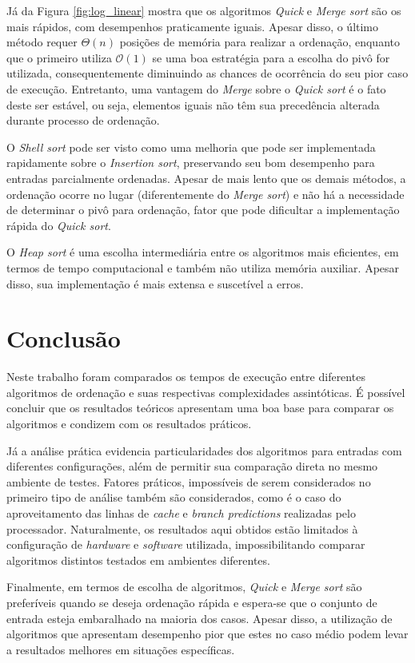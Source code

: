 \documentclass[12pt]{article}
\begin{document}
Já da Figura \ref{fig:log_linear} mostra que os algoritmos \textit{Quick} e \textit{Merge sort} são os mais rápidos, com desempenhos praticamente iguais. Apesar disso, o último método requer $\Theta(n)$ posições de memória para realizar a ordenação, enquanto que o primeiro utiliza $\mathcal{O}(1)$ se uma boa estratégia para a escolha do pivô for utilizada, consequentemente diminuindo as chances de ocorrência do seu pior caso de execução. Entretanto, uma vantagem do \textit{Merge} sobre o \textit{Quick sort} é o fato deste ser estável, ou seja, elementos iguais não têm sua precedência alterada durante processo de ordenação.

O \textit{Shell sort} pode ser visto como uma melhoria que pode ser implementada rapidamente sobre o \textit{Insertion sort}, preservando seu bom desempenho para entradas parcialmente ordenadas. Apesar de mais lento que os demais métodos, a ordenação ocorre no lugar (diferentemente do \textit{Merge sort}) e não há a necessidade de determinar o pivô para ordenação, fator que pode dificultar a implementação rápida do \textit{Quick sort}.

O \textit{Heap sort} é uma escolha intermediária entre os algoritmos mais eficientes, em termos de tempo computacional e também não utiliza memória auxiliar. Apesar disso, sua implementação é mais extensa e suscetível a erros.

\section{Conclusão}

Neste trabalho foram comparados os tempos de execução entre diferentes algoritmos de ordenação e suas respectivas complexidades assintóticas. É possível concluir que os resultados teóricos apresentam uma boa base para comparar os algoritmos e condizem com os resultados práticos.

Já a análise prática evidencia particularidades dos algoritmos para entradas com diferentes configurações, além de permitir sua comparação direta no mesmo ambiente de testes. Fatores práticos, impossíveis de serem considerados no primeiro tipo de análise também são considerados, como é o caso do aproveitamento das linhas de \textit{cache} e \textit{branch predictions} realizadas pelo processador. Naturalmente, os resultados aqui obtidos estão limitados à configuração de \textit{hardware} e \textit{software} utilizada, impossibilitando comparar algoritmos distintos testados em ambientes diferentes.

Finalmente, em termos de escolha de algoritmos, \textit{Quick} e \textit{Merge sort} são preferíveis quando se deseja ordenação rápida e espera-se que o conjunto de entrada esteja embaralhado na maioria dos casos. Apesar disso, a utilização de algoritmos que apresentam desempenho pior que estes no caso médio podem levar a resultados melhores em situações específicas.

\printbibliography
\end{document}
